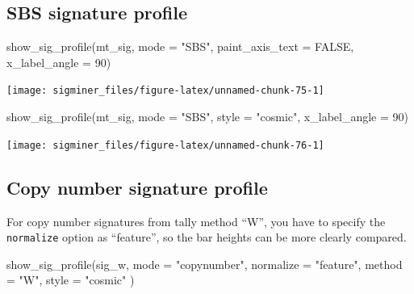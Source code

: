\documentclass[
  12pt,
  a4paper,
  twoside]{book}
\newenvironment{Shaded}{\begin{snugshade}}{\end{snugshade}}
\newcommand{\AttributeTok}[1]{\textcolor[rgb]{0.77,0.63,0.00}{#1}}
\newcommand{\ConstantTok}[1]{\textcolor[rgb]{0.00,0.00,0.00}{#1}}
\newcommand{\DecValTok}[1]{\textcolor[rgb]{0.00,0.00,0.81}{#1}}
\newcommand{\FunctionTok}[1]{\textcolor[rgb]{0.00,0.00,0.00}{#1}}
\newcommand{\NormalTok}[1]{#1}
\newcommand{\StringTok}[1]{\textcolor[rgb]{0.31,0.60,0.02}{#1}}
\begin{document}
\hypertarget{sbs-signature-profile}{%
\subsection{SBS signature profile}\label{sbs-signature-profile}}

\begin{Shaded}
\begin{Highlighting}[]
\FunctionTok{show\_sig\_profile}\NormalTok{(mt\_sig, }\AttributeTok{mode =} \StringTok{"SBS"}\NormalTok{, }\AttributeTok{paint\_axis\_text =} \ConstantTok{FALSE}\NormalTok{, }\AttributeTok{x\_label\_angle =} \DecValTok{90}\NormalTok{)}
\end{Highlighting}
\end{Shaded}

\texttt{[image: sigminer\_files/figure-latex/unnamed-chunk-75-1]}

\begin{Shaded}
\begin{Highlighting}[]
\FunctionTok{show\_sig\_profile}\NormalTok{(mt\_sig, }\AttributeTok{mode =} \StringTok{"SBS"}\NormalTok{, }\AttributeTok{style =} \StringTok{"cosmic"}\NormalTok{, }\AttributeTok{x\_label\_angle =} \DecValTok{90}\NormalTok{)}
\end{Highlighting}
\end{Shaded}

\texttt{[image: sigminer\_files/figure-latex/unnamed-chunk-76-1]}

\hypertarget{copy-number-signature-profile}{%
\subsection{Copy number signature profile}\label{copy-number-signature-profile}}

For copy number signatures from tally method ``W'', you have to specify the \texttt{normalize} option as ``feature'', so the bar heights can be more clearly compared.

\begin{Shaded}
\begin{Highlighting}[]
\FunctionTok{show\_sig\_profile}\NormalTok{(sig\_w,}
  \AttributeTok{mode =} \StringTok{"copynumber"}\NormalTok{,}
  \AttributeTok{normalize =} \StringTok{"feature"}\NormalTok{,}
  \AttributeTok{method =} \StringTok{"W"}\NormalTok{,}
  \AttributeTok{style =} \StringTok{"cosmic"}
\NormalTok{)}
\end{Highlighting}
\end{Shaded}
\end{document}
